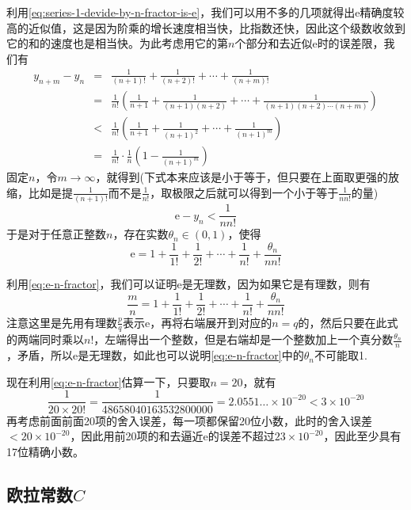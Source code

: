 利用\autoref{eq:series-1-devide-by-n-fractor-is-e}，我们可以用不多的几项就得出$\mathrm{e}$精确度较高的近似值，这是因为阶乘的增长速度相当快，比指数还快，因此这个级数收敛到它的和的速度也是相当快。为此考虑用它的第$n$个部分和去近似$\mathrm{e}$时的误差限，我们有
\begin{eqnarray*}
  y_{n+m}-y_n & = & \frac{1}{(n+1)!}+\frac{1}{(n+2)!}+\cdots+\frac{1}{(n+m)!} \\
              & = & \frac{1}{n!} \left( \frac{1}{n+1}+\frac{1}{(n+1)(n+2)}+\cdots+\frac{1}{(n+1)(n+2)\cdots(n+m)} \right) \\
              & < & \frac{1}{n!} \left( \frac{1}{n+1}+\frac{1}{(n+1)^2}+\cdots+\frac{1}{(n+1)^m} \right) \\
              & = & \frac{1}{n!} \cdot \frac{1}{n} \left(1-\frac{1}{(n+1)^m} \right)
\end{eqnarray*}
固定$n$，令$m \to \infty$，就得到(下式本来应该是小于等于，但只要在上面取更强的放缩，比如是提$\frac{1}{(n+1)!}$而不是$\frac{1}{n!}$，取极限之后就可以得到一个小于等于$\frac{1}{nn!}$的量)
\[ \mathrm{e}-y_n < \frac{1}{nn!} \]
于是对于任意正整数$n$，存在实数$\theta_n \in (0,1)$，使得
\begin{equation}
  \label{eq:e-n-fractor}
 \mathrm{e} = 1+\frac{1}{1!}+\frac{1}{2!}+\cdots+\frac{1}{n!}+\frac{\theta_n}{nn!} 
\end{equation}

利用\autoref{eq:e-n-fractor}，我们可以证明$\mathrm{e}$是无理数，因为如果它是有理数，则有
 \[ \frac{m}{n} = 1+\frac{1}{1!}+\frac{1}{2!}+\cdots+\frac{1}{n!}+\frac{\theta_n}{nn!} \]
注意这里是先用有理数$\frac{p}{q}$表示$\mathrm{e}$，再将右端展开到对应的$n=q$的，然后只要在此式的两端同时乘以$n!$，左端得出一个整数，但是右端却是一个整数加上一个真分数$\frac{\theta_n}{n}$，矛盾，所以$\mathrm{e}$是无理数，如此也可以说明\autoref{eq:e-n-fractor}中的$\theta_n$不可能取1.

现在利用\autoref{eq:e-n-fractor}估算一下，只要取$n=20$，就有
\[ \frac{1}{20\times 20!}=\frac{1}{48658040163532800000}= 2.0551\ldots \times 10^{-20} < 3 \times 10^{-20} \]
再考虑前面前面20项的舍入误差，每一项都保留20位小数，此时的舍入误差$<20\times 10^{-20}$，因此用前20项的和去逼近$\mathrm{e}$的误差不超过$23 \times 10^{-20}$，因此至少具有17位精确小数。

\subsection{欧拉常数$C$}
\label{sec:euler-constant}

